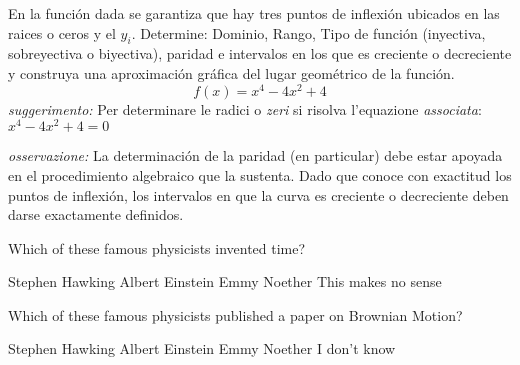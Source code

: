 \documentclass[11pt, a4paper]{exam}
\begin{document}
\begin{questions}
\addpoints
\question[25]  En la funci\'on dada se garantiza que hay tres puntos de inflexi\'on ubicados en las raices o ceros y el $y_i$. Determine: Dominio, Rango, Tipo de funci\'on (inyectiva, sobreyectiva o biyectiva), paridad e intervalos en los que es creciente o decreciente y construya una aproximaci\'on gr\'afica del lugar geom\'etrico de la funci\'on.
\[
	f(x) = x^4 - 4x^2 + 4
\]
\emph{suggerimento:} Per determinare le radici o {\em zeri} si risolva l'equazione {\em associata}: \(x^4 - 4x^2 + 4 = 0\)

\emph{osservazione:} La determinaci\'on de la paridad (en particular) debe estar apoyada en el procedimiento algebraico que la sustenta. Dado que conoce con exactitud los puntos de inflexi\'on, los intervalos en que la curva es creciente o decreciente deben darse exactamente definidos.

\addpoints
\question [12]Which of these famous physicists invented time?

\begin{oneparchoices}
 \choice Stephen Hawking 
 \choice Albert Einstein
 \choice Emmy Noether
 \choice This makes no sense
\end{oneparchoices}

\addpoints
\question [20]Which of these famous physicists published a paper on Brownian Motion?

\begin{checkboxes}
 \choice Stephen Hawking 
 \choice Albert Einstein
 \choice Emmy Noether
 \choice I don't know
\end{checkboxes}

%
%
%


\end{questions}
\end{document}
